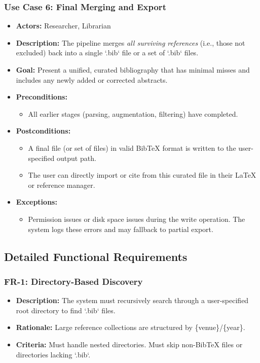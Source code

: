 \documentclass[12pt]{article}
\begin{document}
\subsubsection{Use Case 6: Final Merging and Export}
\begin{itemize}
  \item \textbf{Actors:} Researcher, Librarian
  \item \textbf{Description:} The pipeline merges \emph{all surviving references} (i.e., those not excluded) back into a single `.bib` file or a set of `.bib` files. 
  \item \textbf{Goal:} Present a unified, curated bibliography that has minimal misses and includes any newly added or corrected abstracts.
  \item \textbf{Preconditions:}
    \begin{itemize}
      \item All earlier stages (parsing, augmentation, filtering) have completed.
    \end{itemize}
  \item \textbf{Postconditions:}
    \begin{itemize}
      \item A final file (or set of files) in valid BibTeX format is written to the user-specified output path.
      \item The user can directly import or cite from this curated file in their \LaTeX\, or reference manager.
    \end{itemize}
  \item \textbf{Exceptions:}
    \begin{itemize}
      \item Permission issues or disk space issues during the write operation. The system logs these errors and may fallback to partial export.
    \end{itemize}
\end{itemize}


\newpage

\subsection{Detailed Functional Requirements}

\subsubsection{FR-1: Directory-Based Discovery}
\begin{itemize}
  \item \textbf{Description:} The system must recursively search through a user-specified root directory to find `.bib` files.
  \item \textbf{Rationale:} Large reference collections are structured by \{venue\}/\{year\}. 
  \item \textbf{Criteria:} Must handle nested directories. Must skip non-BibTeX files or directories lacking `.bib`.
\end{itemize}
\end{document}
